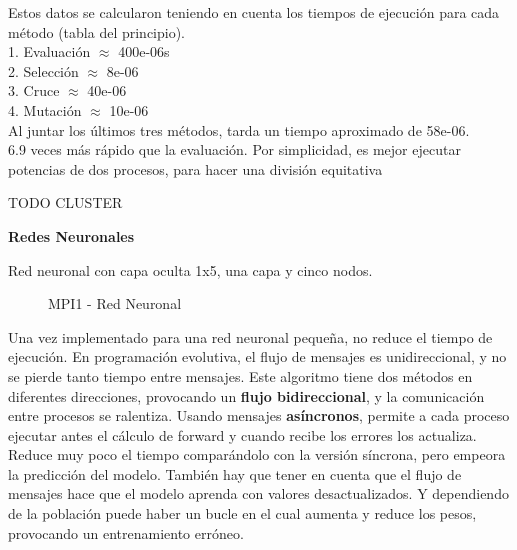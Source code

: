 Estos datos se calcularon teniendo en cuenta los tiempos de ejecución para cada método (tabla del principio). \\
1. Evaluación $\approx$ 400e-06s \\
2. Selección $\approx$ 8e-06\\
3. Cruce $\approx$ 40e-06\\
4. Mutación $\approx$ 10e-06\\
Al juntar los últimos tres métodos, tarda un tiempo aproximado de 58e-06. \\
6.9 veces más rápido que la evaluación. Por simplicidad, es mejor ejecutar potencias de dos procesos, para hacer una división equitativa


\color{blue} TODO CLUSTER

\color{black}
\newpage

\begin{flushleft}
	\textbf{Redes Neuronales}
\end{flushleft}

Red neuronal con capa oculta 1x5, una capa y cinco nodos.

\begin{figure}[!h]
	\centering
	\caption{MPI1 - Red Neuronal}
\end{figure}

Una vez implementado para una red neuronal pequeña, no reduce el tiempo de ejecución. En programación evolutiva, el flujo de mensajes es unidireccional, y no se pierde tanto tiempo entre mensajes. Este algoritmo tiene dos métodos en diferentes direcciones, provocando un \textbf{flujo bidireccional}, y la comunicación entre procesos se ralentiza. Usando mensajes \textbf{asíncronos}, permite a cada proceso ejecutar antes el cálculo de forward y cuando recibe los errores los actualiza. Reduce muy poco el tiempo comparándolo con la versión síncrona, pero empeora la predicción del modelo.
También hay que tener en cuenta que el flujo de mensajes hace que el modelo aprenda con valores desactualizados. Y dependiendo de la población puede haber un bucle en el cual aumenta y reduce los pesos, provocando un entrenamiento erróneo.

